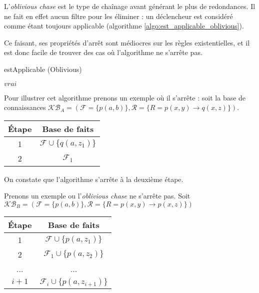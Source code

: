 L'\textit{oblivious chase} est le type de chaînage avant générant le plus de redondances. Il ne fait en effet aucun filtre pour les éliminer : un déclencheur est considéré comme étant toujours applicable (algorithme \ref{algo:est_applicable_oblivious}).
\par Ce faisant, ses propriétés d'arrêt sont médiocres sur les règles existentielles, et il est donc facile de trouver des cas où l'algorithme ne s'arrête pas.

\begin{algorithm}[H]\label{algo:est_applicable_oblivious}
\caption{estApplicable (Oblivious)}
\SetAlgoLined
\DontPrintSemicolon
{}
\Return $vrai$
\end{algorithm}

Pour illustrer cet algorithme prenons un exemple où il s'arrête : soit la base de connaissances $\mathcal{KB}_A = (\mathcal{F} = \{p(a,b)\}, \mathcal{R} = \{R = p(x,y) \rightarrow q(x,z) \})$.
\begin{center}
\begin{tabular}{|c|c|}
    \hline
    Étape & Base de faits  \\ 
    \hline
    1 &$\mathcal{F} \cup \{q(a, z_1)\}$ \\ 
    \hline
    2 &$\mathcal{F}_1$  \\
    \hline
\end{tabular}
\end{center}
On constate que l'algorithme s'arrête à la deuxième étape.
\par Prenons un exemple ou l'\textit{oblivious chase} ne s'arrête pas. Soit
$\mathcal{KB}_B = (\mathcal{F} = \{p(a,b)\}, \mathcal{R} = \{R = p(x,y) \rightarrow p(x,z) \})$

\begin{center}
\begin{tabular}{|c|c|}
    \hline
    Étape & Base de faits  \\ 
    \hline
    1 &$\mathcal{F} \cup \{p(a, z_1)\}$ \\ 
    \hline
    2 &$\mathcal{F}_1 \cup \{p(a, z_2)\}$ \\
    \hline
    ... & ... \\
    \hline
    $i+1$ & $\mathcal{F}_i \cup \{p(a, z_{i+1})\} $ \\
    \hline
\end{tabular}
\end{center}

